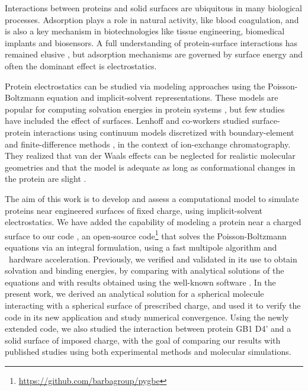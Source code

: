 
Interactions between proteins and solid surfaces are ubiquitous in many biological processes. Adsorption plays a role in natural activity, like blood coagulation, and is also a key mechanism in biotechnologies like tissue engineering, biomedical implants and biosensors.
A full understanding of protein-surface interactions has remained elusive \cite{Gray2004,RabeVerdesSeegel2011}, but adsorption mechanisms are governed by surface energy and often the dominant effect is electrostatics.

Protein electrostatics can be studied via modeling approaches using the Poisson-Boltzmann equation and implicit-solvent representations. These models  are popular for computing solvation energies in protein systems \cite{RouxSimonson1999,Bardhan2012}, but few studies have included the effect of surfaces. Lenhoff and co-workers studied surface-protein interactions using continuum models discretized with boundary-element \cite{YoonLenhoff1992,RothLenhoff1993,AsthagiriLenhoff1997} and finite-difference methods \cite{YaoLenhoff2004,YaoLenhoff2005}, in the context of ion-exchange chromatography. They realized that van der Waals effects can be neglected for realistic molecular geometries \cite{RothNealLenhoff1996} and that the model is adequate as long as conformational changes in the protein are slight \cite{YaoLenhoff2004,YaoLenhoff2005}. 

The aim of this work is to develop and assess a computational model to simulate proteins near engineered surfaces of fixed charge, using implicit-solvent electrostatics.
We have added the capability of modeling a protein near a charged surface to our code \pygbe, an open-source code\footnote{\url{https://github.com/barbagroup/pygbe}}  that solves the Poisson-Boltzmann equations via an integral formulation, using a fast multipole algorithm and \gpu\ hardware acceleration.  Previously, we verified and validated \pygbe in its use to obtain solvation and binding energies, by comparing with analytical solutions of the equations and with results obtained using the well-known \apbs software \cite{CooperBarba-share154331,CooperBardhanBarba2013}. 
In the present work, we derived an analytical solution for a spherical molecule interacting with a spherical surface of prescribed charge, and used it to verify the code in its new application and study numerical convergence.
Using the newly extended code, we also studied the interaction between protein GB1 D4' and a solid surface of imposed charge, with the goal of comparing our results with published studies using both experimental methods\cite{BaioWeidnerBaughGambleStaytonCastner2012} and molecular simulations.\cite{LiuLiaoZhou2013}

